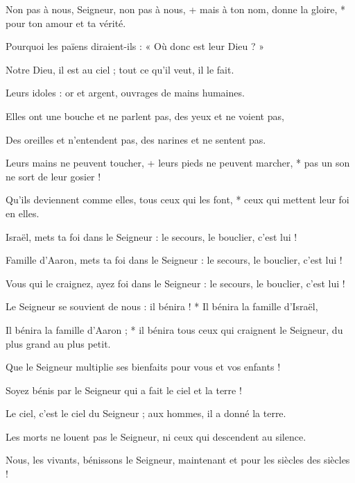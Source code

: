 \item Non pas à nous, Seigneur, non pas à nous, +
mais à ton nom, donne la gloire, *
pour ton amour et ta vérité.

\item Pourquoi les païens diraient-ils :
« Où donc est leur Dieu ? »

\item Notre Dieu, il est au ciel ;
tout ce qu'il veut, il le fait.

\item Leurs idoles : or et argent,
ouvrages de mains humaines.

\item  Elles ont une bouche et ne parlent pas,
des yeux et ne voient pas,

\item Des oreilles et n'entendent pas,
des narines et ne sentent pas.

\item Leurs mains ne peuvent toucher, +
leurs pieds ne peuvent marcher, *
pas un son ne sort de leur gosier !

\item Qu'ils deviennent comme elles,
tous ceux qui les font, *
ceux qui mettent leur foi en elles.

\item Israël, mets ta foi dans le Seigneur :
le secours, le bouclier, c'est lui !

\item Famille d'Aaron, mets ta foi dans le Seigneur :
le secours, le bouclier, c'est lui !

\item Vous qui le craignez, ayez foi dans le Seigneur :
le secours, le bouclier, c'est lui !

\item Le Seigneur se souvient de nous : il bénira ! *
Il bénira la famille d'Israël,

\item Il bénira la famille d'Aaron ; *
il bénira tous ceux qui craignent le Seigneur,
du plus grand au plus petit.

\item Que le Seigneur multiplie ses bienfaits
pour vous et vos enfants !

\item Soyez bénis par le Seigneur
qui a fait le ciel et la terre !

\item Le ciel, c'est le ciel du Seigneur ;
aux hommes, il a donné la terre.

\item Les morts ne louent pas le Seigneur,
ni ceux qui descendent au silence.

\item Nous, les vivants, bénissons le Seigneur,
maintenant et pour les siècles des siècles !